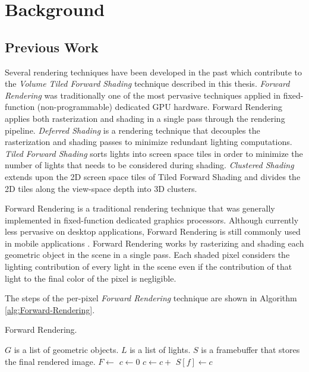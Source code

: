 
\chapter{Background} %
\label{ch:Background}


\section{Previous Work}

Several rendering techniques have been developed in the past which contribute to the \emph{Volume Tiled Forward Shading} technique described in this thesis. \emph{Forward Rendering} was traditionally one of the most pervasive techniques applied in fixed-function (non-programmable) dedicated GPU hardware. Forward Rendering applies both rasterization and shading in a single pass through the rendering pipeline. \emph{Deferred Shading} is a rendering technique that decouples the rasterization and shading passes to minimize redundant lighting computations. \emph{Tiled Forward Shading} sorts lights into screen space tiles in order to minimize the number of lights that needs to be considered during shading. \emph{Clustered Shading} extends upon the 2D screen space tiles of Tiled Forward Shading and divides the 2D tiles along the view-space depth into 3D clusters.

Forward Rendering is a traditional rendering technique that was generally implemented in fixed-function dedicated graphics processors. Although currently less pervasive on desktop applications, Forward Rendering is still commonly used in mobile applications \parencite{37_olsson_2015}. Forward Rendering works by rasterizing and shading each geometric object in the scene in a single pass. Each shaded pixel considers the lighting contribution of every light in the scene even if the contribution of that light to the final color of the pixel is negligible.

The steps of the per-pixel \emph{Forward Rendering} technique are shown in Algorithm \ref{alg:Forward-Rendering}.

\begin{algorithm}[H]
\caption{Forward Rendering.}
\label{alg:Forward-Rendering}
\begin{algorithmic}[1]
\Require $G$ is a list of geometric objects.
\Require $L$ is a list of lights.
\Require $S$ is a framebuffer that stores the final rendered image.
\State $F \gets$ 
\State $c \gets 0$
\State $c \gets c + $ 
\EndFor
\State $S[f] \gets c$
\EndFor
\EndFor
\EndFunction
\end{algorithmic}
\end{algorithm}

